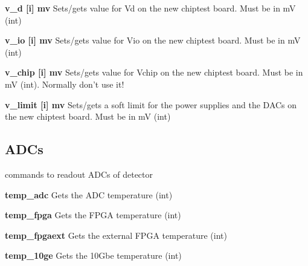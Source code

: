\begin{DoxyItemize}
\item {\bfseries v\_\-d \mbox{[}i\mbox{]} mv} Sets/gets value for Vd on the new chiptest board. Must be in mV (int)
\end{DoxyItemize}


\begin{DoxyItemize}
\item {\bfseries v\_\-io \mbox{[}i\mbox{]} mv} Sets/gets value for Vio on the new chiptest board. Must be in mV (int)
\end{DoxyItemize}


\begin{DoxyItemize}
\item {\bfseries v\_\-chip \mbox{[}i\mbox{]} mv} Sets/gets value for Vchip on the new chiptest board. Must be in mV (int). Normally don't use it!
\end{DoxyItemize}


\begin{DoxyItemize}
\item {\bfseries v\_\-limit \mbox{[}i\mbox{]} mv} Sets/gets a soft limit for the power supplies and the DACs on the new chiptest board. Must be in mV (int)
\end{DoxyItemize}\hypertarget{settings_settingsadcs}{}\subsection{ADCs}\label{settings_settingsadcs}
commands to readout ADCs of detector


\begin{DoxyItemize}
\item {\bfseries temp\_\-adc} Gets the ADC temperature (int)
\end{DoxyItemize}


\begin{DoxyItemize}
\item {\bfseries temp\_\-fpga} Gets the FPGA temperature (int)
\end{DoxyItemize}


\begin{DoxyItemize}
\item {\bfseries temp\_\-fpgaext} Gets the external FPGA temperature (int)
\end{DoxyItemize}


\begin{DoxyItemize}
\item {\bfseries temp\_\-10ge} Gets the 10Gbe temperature (int)
\end{DoxyItemize}


